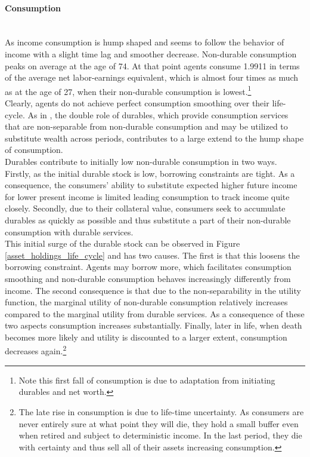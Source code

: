 \documentclass[a4paper,12pt,legno]{article}
\newcommand{\myparagraph}[1]{\paragraph{#1}\mbox{}\\}
\begin{document}
\myparagraph{Consumption} As income consumption is hump shaped and seems to follow the behavior of income with a slight time lag and smoother decrease. Non-durable consumption peaks on average at the age of 74. At that point agents consume 1.9911 in terms of the average net labor-earnings equivalent, which is almost four times as much as at the age of 27, when their non-durable consumption is lowest.\footnote{Note this first fall of consumption is due to adaptation from initiating durables and net worth.} \\
Clearly, agents do not achieve perfect consumption smoothing over their life-cycle. As in \cite{FV&K2011}, the double role of durables, which provide consumption services that are non-separable from non-durable consumption and may be utilized to substitute wealth across periods, contributes to a large extend to the hump shape of consumption.\\
Durables contribute to initially low non-durable consumption in two ways. Firstly, as the initial durable stock is low, borrowing constraints are tight. As a consequence, the consumers' ability to substitute expected higher future income for lower present income is limited leading consumption to track income quite closely. Secondly, 
due to their collateral value, consumers seek to accumulate durables as quickly as possible and thus substitute a part of their non-durable consumption with durable services. \\
This initial surge of the durable stock can be observed in Figure \ref{asset_holdings_life_cycle} and has two causes. The first is that this loosens the borrowing constraint. Agents may borrow more, which facilitates consumption smoothing and non-durable consumption behaves increasingly differently from income. The second consequence is that due to the non-separability in the utility function, the marginal utility of non-durable consumption relatively increases compared to the marginal utility from durable services. As a consequence of these two aspects consumption increases substantially. 
Finally, later in life, when death becomes more likely and utility is discounted to a larger extent, consumption decreases again.\footnote{The late rise in consumption is due to life-time uncertainty. As consumers are never entirely sure at what point they will die, they hold a small buffer even when retired and subject to deterministic income. In the last period, they die with certainty and thus sell all of their assets increasing consumption.} 
\end{document}
